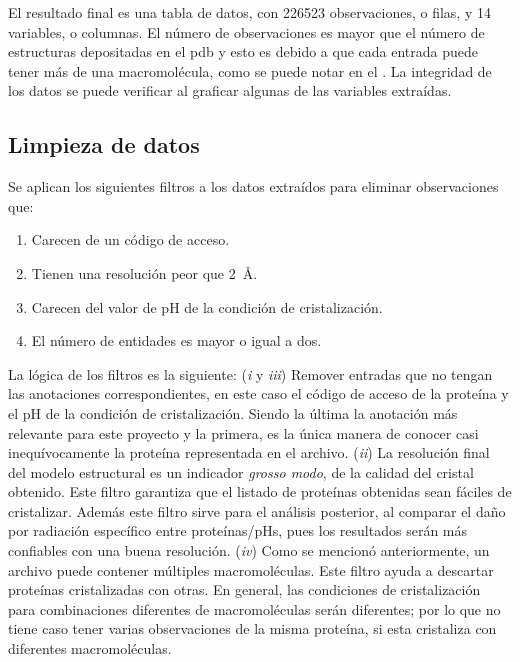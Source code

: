 El resultado final es una tabla de datos, con \num{226523} observaciones, o filas, y \num{14} variables, o columnas. El número de observaciones es mayor que el número de estructuras depositadas en el \acrshort{pdb} y esto es debido a que cada entrada puede tener más de una macromolécula, como se puede notar en el . La integridad de los datos se puede verificar al graficar algunas de las variables extraídas.

\subsection{Limpieza de datos}
Se aplican los siguientes filtros a los datos extraídos para eliminar observaciones que:

\begin{enumerate}
	\item Carecen de un código de acceso.
	\item Tienen una resolución peor que \SI{2}{\angstrom}. 
	\item Carecen del valor de pH de la condición de cristalización.
	\item El número de entidades es mayor o igual a dos.
\end{enumerate}

La lógica de los filtros es la siguiente: (\emph{i} y \emph{iii}) Remover entradas que no tengan las anotaciones correspondientes, en este caso el código de acceso de la proteína y el pH de la condición de cristalización. Siendo la última la anotación más relevante para este proyecto y la primera, es la única manera de conocer casi inequívocamente la proteína representada en el archivo. (\emph{ii}) La resolución final del modelo estructural es un indicador \emph{grosso modo}, de la calidad del cristal obtenido. Este filtro garantiza que el listado de proteínas obtenidas sean fáciles de cristalizar. Además este filtro sirve para el análisis posterior, al comparar el daño por radiación específico entre proteínas/pHs, pues los resultados serán más confiables con una buena resolución. (\emph{iv}) Como se mencionó anteriormente, un archivo puede contener múltiples macromoléculas. Este filtro ayuda a descartar proteínas cristalizadas con otras. En general, las condiciones de cristalización para combinaciones diferentes de macromoléculas serán diferentes; por lo que no tiene caso tener varias observaciones de la misma proteína, si esta cristaliza con diferentes macromoléculas. 

